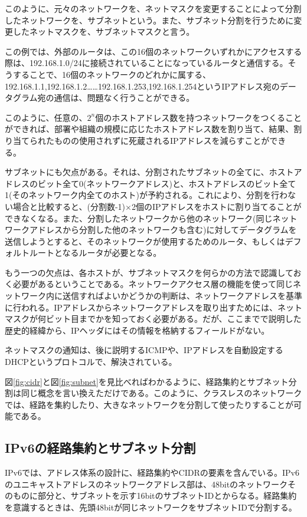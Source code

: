 このように、元々のネットワークを、ネットマスクを変更することによって分割したネットワークを、サブネットという。また、サブネット分割を行うために変更したネットマスクを、サブネットマスクと言う。

この例では、外部のルータは、この16個のネットワークいずれかにアクセスする際は、192.168.1.0/24に接続されていることになっているルータと通信する。そうすることで、16個のネットワークのどれかに属する、 192.168.1.1,192.168.1.2……192.168.1.253,192.168.1.254というIPアドレス宛のデータグラム宛の通信は、問題なく行うことができる。

このように、任意の、$2^n$個のホストアドレス数を持つネットワークをつくることができれば、部署や組織の規模に応じたホストアドレス数を割り当て、結果、割り当てられたものの使用されずに死蔵されるIPアドレスを減らすことができる。

サブネットにも欠点がある。それは、分割されたサブネットの全てに、ホストアドレスのビット全て0(ネットワークアドレス)と、ホストアドレスのビット全て1(そのネットワーク内全てのホスト)が予約される。これにより、分割を行わない場合と比較すると、(分割数-1)×2個のIPアドレスをホストに割り当てることができなくなる。また、分割したネットワークから他のネットワーク(同じネットワークアドレスから分割した他のネットワークも含む)に対してデータグラムを送信しようとすると、そのネットワークが使用するためのルータ、もしくはデフォルトルートとなるルータが必要となる。

もう一つの欠点は、各ホストが、サブネットマスクを何らかの方法で認識しておく必要があるということである。ネットワークアクセス層の機能を使って同じネットワーク内に送信すればよいかどうかの判断は、ネットワークアドレスを基準に行われる。IPアドレスからネットワークアドレスを取り出すためには、ネットマスクが何ビット目までかを知っておく必要がある。だが、ここまでで説明した歴史的経緯から、IPヘッダにはその情報を格納するフィールドがない。

ネットマスクの通知は、後に説明するICMPや、IPアドレスを自動設定するDHCPというプロトコルで、解決されている。

図\ref{fig:cidr}と図\ref{fig:subnet}を見比べればわかるように、経路集約とサブネット分割は同じ概念を言い換えただけである。このように、クラスレスのネットワークでは、経路を集約したり、大きなネットワークを分割して使ったりすることが可能である。

\subsection{IPv6の経路集約とサブネット分割}
IPv6では、アドレス体系の設計に、経路集約やCIDRの要素を含んでいる。IPv6のユニキャストアドレスのネットワークアドレス部は、48bitのネットワークそのものに部分と、サブネットを示す16bitのサブネットIDとからなる。経路集約を意識するときは、先頭48bitが同じネットワークをサブネットIDで分割する。

